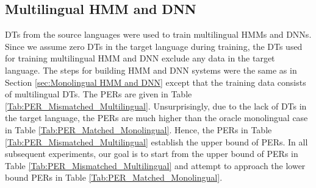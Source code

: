 \documentclass[a4paper]{article}
\begin{document}
\subsection{Multilingual HMM and DNN} \vspace{-1mm}
\label{sec:Multilingual HMM and DNN}
DTs from the source languages were used to train multilingual HMMs and DNNs. Since we assume zero DTs in the target language during training, the DTs used for training multilingual HMM and DNN exclude any data in the target language. The steps for building HMM and DNN systems were the same as in Section \ref{sec:Monolingual HMM and DNN} except that the training data consists of multilingual DTs. The PERs are given in Table \ref{Tab:PER_Mismatched_Multilingual}. Unsurprisingly, due to the lack of DTs in the target language, the PERs are much higher than the oracle monolingual case in Table \ref{Tab:PER_Matched_Monolingual}. Hence, the PERs in Table \ref{Tab:PER_Mismatched_Multilingual} establish the upper bound of PERs. In all subsequent experiments, our goal is to start from the upper bound of PERs in Table \ref{Tab:PER_Mismatched_Multilingual} and attempt to approach the lower bound PERs in Table \ref{Tab:PER_Matched_Monolingual}. 
\end{document}
